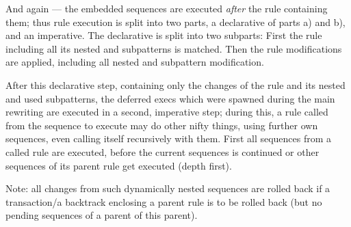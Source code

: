 \begin{warning}
And again --- the embedded sequences are executed \emph{after} the rule containing them;
thus rule execution is split into two parts, a declarative of parts a) and b), and an imperative.
The declarative is split into two subparts:
First the rule including all its nested and subpatterns is matched.
Then the rule modifications are applied, including all nested and subpattern modification.

After this declarative step, containing only the changes of the rule and its nested and used subpatterns,
the deferred execs which were spawned during the main rewriting are executed in a second, imperative step;
during this, a rule called from the sequence to execute may do other nifty things,
using further own sequences, even calling itself recursively with them.
First all sequences from a called rule are executed, before the current sequences is continued or other sequences of its parent rule get executed (depth first).

Note: all changes from such dynamically nested sequences are rolled back if a transaction/a backtrack enclosing a parent rule is to be rolled back (but no pending sequences of a parent of this parent).
\end{warning}


